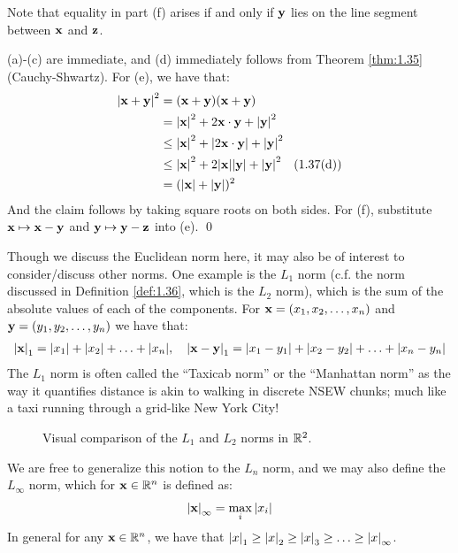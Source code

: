 \noindent Note that equality in part (f) arises if and only if $\mathbf{y}$ lies on the line segment between $\mathbf{x}$ and $\mathbf{z}$.

\begin{nproof}
    (a)-(c) are immediate, and (d) immediately follows from Theorem \ref{thm:1.35} (Cauchy-Shwartz). For (e), we have that:
    \begin{align*}
        \abs{\mathbf{x} + \mathbf{y}}^2 &= (\mathbf{x} + \mathbf{y})(\mathbf{x} + \mathbf{y})
        \\ &= \abs{\mathbf{x}}^2 + 2\mathbf{x}\cdot\mathbf{y} + \abs{\mathbf{y}}^2
        \\ &\leq \abs{\mathbf{x}}^2 + \abs{2\mathbf{x}\cdot\mathbf{y}} + \abs{\mathbf{y}}^2
        \\ &\leq \abs{\mathbf{x}}^2 + 2\abs{\mathbf{x}}\abs{\mathbf{y}} + \abs{\mathbf{y}}^2 \quad \text{(1.37(d))}
        \\ &= (\abs{\mathbf{x}} + \abs{\mathbf{y}})^2
    \end{align*}
    And the claim follows by taking square roots on both sides. For (f), substitute $\mathbf{x} \mapsto \mathbf{x} - \mathbf{y}$ and $\mathbf{y} \mapsto \mathbf{y} - \mathbf{z}$ into (e). \qed
\end{nproof}

Though we discuss the Euclidean norm here, it may also be of interest to consider/discuss other norms. One example is the $L_1$ norm (c.f. the norm discussed in Definition \ref{def:1.36}, which is the $L_2$ norm), which is the sum of the absolute values of each of the components. For $\mathbf{x} = (x_1, x_2, \ldots, x_n)$ and $\mathbf{y} = (y_1, y_2, \ldots, y_n)$ we have that:
\begin{align*}
    \abs{\mathbf{x}}_1 = \abs{x_1} + \abs{x_2} + \ldots + \abs{x_n}, \quad \abs{\mathbf{x} - \mathbf{y}}_{1} = \abs{x_1 - y_1} + \abs{x_2 - y_2} + \ldots + \abs{x_n - y_n}
\end{align*}
The $L_1$ norm is often called the ``Taxicab norm'' or the ``Manhattan norm'' as the way it quantifies distance is akin to walking in discrete NSEW chunks; much like a taxi running through a grid-like New York City!
\begin{figure}[htbp]
    \centering
    \caption{Visual comparison of the $L_1$ and $L_2$ norms in $\mathbb{R}^2$.}
    \label{fig4}
\end{figure}
\noindent We are free to generalize this notion to the $L_n$ norm, and we may also define the $L_{\infty}$ norm, which for $\mathbf{x} \in \mathbb{R}^n$ is defined as:
\begin{align*}
    \abs{\mathbf{x}}_\infty = \max_i \abs{x_i}
\end{align*}
In general for any $\mathbf{x} \in \mathbb{R}^n$, we have that $\abs{x}_1 \geq \abs{x}_2 \geq \abs{x}_3 \geq \ldots \geq \abs{x}_\infty$. 

